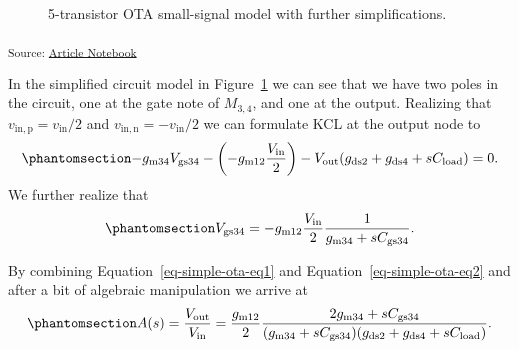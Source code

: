\documentclass[
  a4paper,
  DIV=11,
  numbers=noendperiod]{scrartcl}
\begin{document}
\begin{figure}[H]


\caption{\label{fig-basic-ota-small-signal-simplified}5-transistor OTA
small-signal model with further simplifications.}

\end{figure}%

\textsubscript{Source:
\href{https://iic-jku.github.io/analog-circuit-design/index.qmd.html}{Article
Notebook}}

In the simplified circuit model in
Figure~\ref{fig-basic-ota-small-signal-simplified} we can see that we
have two poles in the circuit, one at the gate note of \(M_{3,4}\), and
one at the output. Realizing that \(v_\mathrm{in,p} = v_\mathrm{in}/2\)
and \(v_\mathrm{in,n} = - v_\mathrm{in}/2\) we can formulate KCL at the
output node to \begin{equation}\phantomsection\label{eq-simple-ota-eq1}{
-g_\mathrm{m34} V_\mathrm{gs34} - \left( -g_\mathrm{m12} \frac{V_\mathrm{in}}{2} \right) - V_\mathrm{out} (g_\mathrm{ds2} + g_\mathrm{ds4} + s C_\mathrm{load}) = 0.
}\end{equation} We further realize that
\begin{equation}\phantomsection\label{eq-simple-ota-eq2}{
V_\mathrm{gs34} = -g_\mathrm{m12} \frac{V_\mathrm{in}}{2} \frac{1}{g_\mathrm{m34} + s C_\mathrm{gs34}}.
 }\end{equation}

By combining Equation~\ref{eq-simple-ota-eq1} and
Equation~\ref{eq-simple-ota-eq2} and after a bit of algebraic
manipulation we arrive at
\begin{equation}\phantomsection\label{eq-simple-ota-gain}{
A(s) = \frac{V_\mathrm{out}}{V_\mathrm{in}} = \frac{g_\mathrm{m12}}{2} \frac{2 g_\mathrm{m34} + s C_\mathrm{gs34}}{(g_\mathrm{m34} + s C_\mathrm{gs34}) (g_\mathrm{ds2} + g_\mathrm{ds4} + s C_\mathrm{load})}.
}\end{equation}
\end{document}
